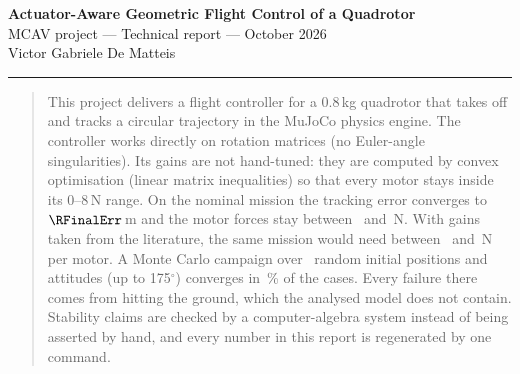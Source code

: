 \documentclass[10pt,a4paper]{scrartcl}
\begin{document}

  \begin{center}
    {\Huge\bfseries\color{accent} Actuator-Aware Geometric Flight Control of a Quadrotor}\\[0.25cm]
    {\small MCAV project --- Technical report --- October 2026}\\[0.15cm]
    {\small Victor Gabriele De Matteis}\\[0.2cm]
    {\color{accent!35}\hrule height 0.5pt}
  \end{center}

  \vspace{0.3em}

  \begin{abstract}
  \noindent
  This project delivers a flight controller for a 0.8\,kg quadrotor that takes off and tracks a
  circular trajectory in the MuJoCo physics engine. The controller works directly on rotation
  matrices (no Euler-angle singularities). Its gains are not hand-tuned: they are computed by
  convex optimisation (linear matrix inequalities) so that every motor stays inside its
  0--8\,N range. On the nominal mission the tracking error converges to $\RFinalErr$\,m and the
  motor forces stay between \RFMin\ and \RFMax\,N. With gains taken from the literature, the
  same mission would need between \RPaperFMin\ and \RPaperFMax\,N per motor. A Monte Carlo campaign over
  \RMcN\ random initial positions and attitudes (up to 175$^\circ$) converges in \RMcConverged\,\% of the cases.
  Every failure there comes from hitting the ground, which the analysed model does not contain.
  Stability claims are checked by a computer-algebra system instead of being asserted by hand,
  and every number in this report is regenerated by one command.
  \end{abstract}
\end{document}
